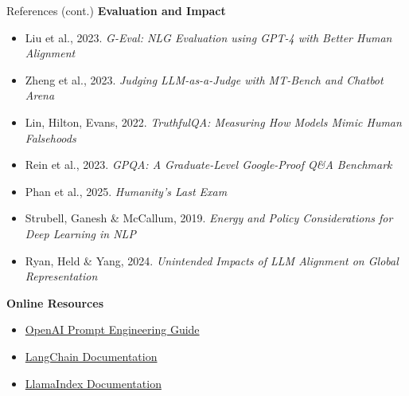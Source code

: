 \begin{frame}[t]{References (cont.)}
    \vspace{0.4em}
    \textbf{Evaluation and Impact}
    \scriptsize
    \begin{itemize}
        \setlength{\itemsep}{0.12em}
        \item[\textcolor{red}{$\triangleright$}] Liu et al., 2023. \textit{G-Eval: NLG Evaluation using GPT-4 with Better Human Alignment}
        \item[\textcolor{red}{$\triangleright$}] Zheng et al., 2023. \textit{Judging LLM-as-a-Judge with MT-Bench and Chatbot Arena}
        \item[\textcolor{red}{$\triangleright$}] Lin, Hilton, Evans, 2022. \textit{TruthfulQA: Measuring How Models Mimic Human Falsehoods}
        \item[\textcolor{red}{$\triangleright$}] Rein et al., 2023. \textit{GPQA: A Graduate-Level Google-Proof Q\&A Benchmark}
        \item[\textcolor{red}{$\triangleright$}] Phan et al., 2025. \textit{Humanity's Last Exam}
        \item[\textcolor{red}{$\triangleright$}] Strubell, Ganesh \& McCallum, 2019. \textit{Energy and Policy Considerations for Deep Learning in NLP}
        \item[\textcolor{red}{$\triangleright$}] Ryan, Held \& Yang, 2024. \textit{Unintended Impacts of LLM Alignment on Global Representation}
    \end{itemize}

    \vspace{0.8em}
    \normalsize\textbf{Online Resources}
    \scriptsize
    \begin{itemize}
        \setlength{\itemsep}{0.12em}
        \item[\textcolor{red}{$\triangleright$}] \href{https://platform.openai.com/docs/guides/prompt-engineering}{OpenAI Prompt Engineering Guide}
        \item[\textcolor{red}{$\triangleright$}] \href{https://python.langchain.com/docs/}{LangChain Documentation}
        \item[\textcolor{red}{$\triangleright$}] \href{https://docs.llamaindex.ai/}{LlamaIndex Documentation}
    \end{itemize}
\end{frame}

